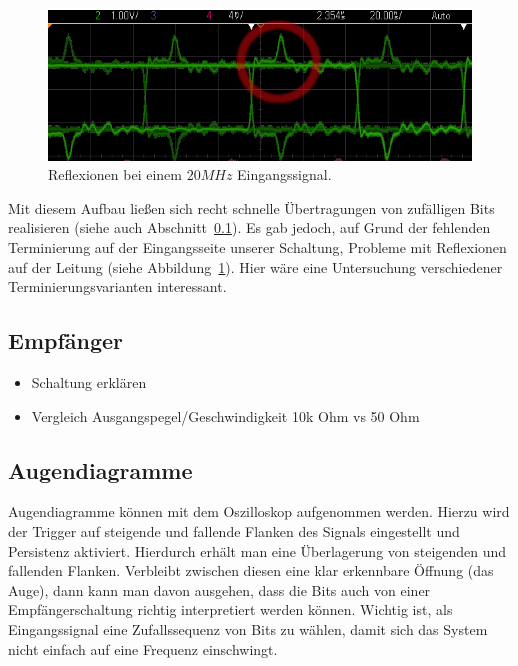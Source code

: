 \documentclass[12pt,a4paper]{article}
\begin{document}
\begin{figure}[h!]
  \centering
    \includegraphics[width=1.0\textwidth]{img/ring_20MHz.png}
  \caption{Reflexionen bei einem $20MHz$ Eingangssignal.}
  \label{fig:ring_20mhz}
\end{figure}

Mit diesem Aufbau ließen sich recht schnelle Übertragungen von zufälligen Bits realisieren (siehe auch Abschnitt~\ref{sec:direct_rx}). Es gab jedoch, auf Grund der fehlenden Terminierung auf der Eingangsseite unserer Schaltung, Probleme mit Reflexionen auf der Leitung (siehe Abbildung~\ref{fig:ring_20mhz}). Hier wäre eine Untersuchung verschiedener Terminierungsvarianten interessant.

\subsection{Empfänger}
\label{sec:direct_rx}




\begin{itemize}
\item Schaltung erklären
\item Vergleich Ausgangspegel/Geschwindigkeit 10k Ohm vs 50 Ohm
\end{itemize}

\subsection{Augendiagramme}
Augendiagramme können mit dem Oszilloskop aufgenommen werden. Hierzu wird der Trigger auf steigende und fallende Flanken des Signals eingestellt und Persistenz aktiviert. Hierdurch erhält man eine Überlagerung von steigenden und fallenden Flanken. Verbleibt zwischen diesen eine klar erkennbare Öffnung (das Auge), dann kann man davon ausgehen, dass die Bits auch von einer Empfängerschaltung richtig interpretiert werden können. Wichtig ist, als Eingangssignal eine Zufallssequenz von Bits zu wählen, damit sich das System nicht einfach auf eine Frequenz einschwingt.
\end{document}
